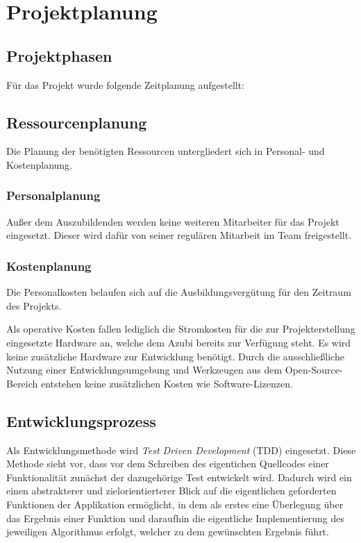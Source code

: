 \section{Projektplanung}
\label{sec:Projektplanung}


\subsection{Projektphasen}
\label{sec:Projektphasen}
Für das Projekt wurde folgende Zeitplanung aufgestellt:


\subsection{Ressourcenplanung}
\label{sec:Ressourcenplanung}
Die Planung der benötigten Ressourcen untergliedert sich in Personal- und Kostenplanung.
\subsubsection{Personalplanung}
\label{sec:Personalplanung}
Außer dem Auszubildenden werden keine weiteren Mitarbeiter für das Projekt eingesetzt. Dieser wird
dafür von seiner regulären Mitarbeit im Team freigestellt.
\subsubsection{Kostenplanung}
\label{sec:Kostenplanung}
Die Personalkosten belaufen sich auf die Ausbildungsvergütung für den Zeitraum des Projekts.

Als operative Kosten fallen lediglich die Stromkosten für die zur Projekterstellung eingesetzte
Hardware an, welche dem Azubi bereits zur Verfügung steht. Es wird keine zusätzliche Hardware zur
Entwicklung benötigt. Durch die ausschließliche Nutzung einer Entwicklungsumgebung und Werkzeugen aus dem
Open-Source-Bereich entstehen keine zusätzlichen Kosten wie Software-Lizenzen.

\subsection{Entwicklungsprozess}
\label{sec:Entwicklungsprozess}
Als Entwicklungsmethode wird \textit{Test Driven Development} (\acs{TDD}) eingesetzt. Diese Methode
sieht vor, dass vor dem Schreiben des eigentichen Quellcodes einer Funktionalität zunächst der
dazugehörige Test entwickelt wird. Dadurch wird ein einen abstrakterer und
zielorientierterer Blick auf die eigentlichen geforderten Funktionen der Applikation ermöglicht, in
dem als erstes eine Überlegung über das Ergebnis einer Funktion und daraufhin die eigentliche Implementierung
des jeweiligen Algorithmus erfolgt, welcher zu dem gewünschten Ergebnis führt.

